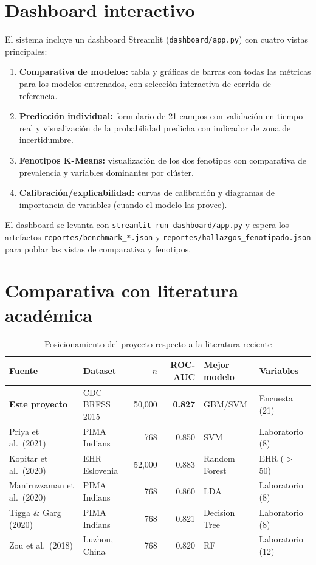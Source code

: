 \documentclass[12pt,a4paper]{article}
\begin{document}
\section{Dashboard interactivo}

El sistema incluye un dashboard Streamlit (\texttt{dashboard/app.py}) con cuatro vistas principales:

\begin{enumerate}
  \item \textbf{Comparativa de modelos:} tabla y gráficas de barras con todas las métricas para los modelos entrenados, con selección interactiva de corrida de referencia.
  \item \textbf{Predicción individual:} formulario de 21 campos con validación en tiempo real y visualización de la probabilidad predicha con indicador de zona de incertidumbre.
  \item \textbf{Fenotipos K-Means:} visualización de los dos fenotipos con comparativa de prevalencia y variables dominantes por clúster.
  \item \textbf{Calibración/explicabilidad:} curvas de calibración y diagramas de importancia de variables (cuando el modelo las provee).
\end{enumerate}

El dashboard se levanta con \texttt{streamlit run dashboard/app.py} y espera los artefactos \texttt{reportes/benchmark\_*.json} y \texttt{reportes/hallazgos\_fenotipado.json} para poblar las vistas de comparativa y fenotipos.

\section{Comparativa con literatura académica}

\begin{table}[H]
  \centering
  \caption{Posicionamiento del proyecto respecto a la literatura reciente}
  \label{tab:literatura}
  \begin{tabular}{llrrll}
    \toprule
    \textbf{Fuente} & \textbf{Dataset} & \textbf{$n$} & \textbf{ROC-AUC} & \textbf{Mejor modelo} & \textbf{Variables}\\
    \midrule
    \textbf{Este proyecto} & CDC BRFSS 2015 & 50{,}000 & \textbf{0.827} & GBM/SVM & Encuesta (21)\\
    Priya et al.\ (2021) & PIMA Indians & 768 & 0.850 & SVM & Laboratorio (8)\\
    Kopitar et al.\ (2020) & EHR Eslovenia & 52{,}000 & 0.883 & Random Forest & EHR ($>$50)\\
    Maniruzzaman et al.\ (2020) & PIMA Indians & 768 & 0.860 & LDA & Laboratorio (8)\\
    Tigga \& Garg (2020) & PIMA Indians & 768 & 0.821 & Decision Tree & Laboratorio (8)\\
    Zou et al.\ (2018) & Luzhou, China & 768 & 0.820 & RF & Laboratorio (12)\\
    \bottomrule
  \end{tabular}
\end{table}
\end{document}
